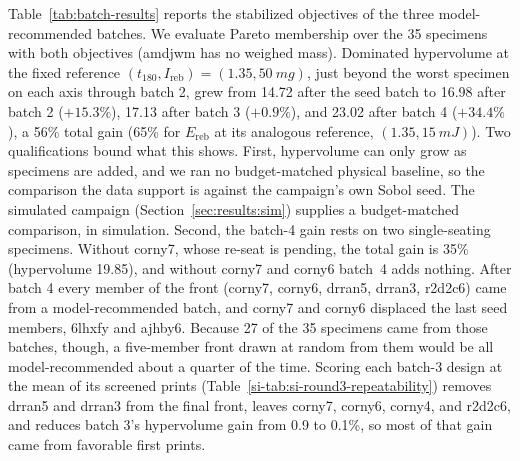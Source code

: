 \documentclass[lineno,nocopyright,upint,varvw,hyphenate]{asmejour}
\newcommand{\siref}[1]{\ref*{si-#1}}
\begin{document}
Table~\ref{tab:batch-results} reports the stabilized objectives of the
three model-recommended batches. We evaluate Pareto membership over the
35 specimens with both objectives (amdjwm has no weighed mass).
Dominated hypervolume at the fixed reference
$(t_{180}, I_{\mathrm{reb}}) = (1.35, \SI{50}{mg})$, just beyond the
worst specimen on each axis through batch 2, grew from 14.72 after the
seed batch to 16.98 after batch 2 ($+15.3\%$), 17.13 after batch 3
($+0.9\%$), and 23.02 after batch 4 ($+34.4\%$), a 56\% total gain (65\%
for $E_{\mathrm{reb}}$ at its analogous reference, $(1.35, \SI{15}{mJ})$).
Two qualifications bound what this shows. First, hypervolume can only
grow as specimens are added, and we ran no budget-matched physical
baseline, so the comparison the data support is against the campaign's
own Sobol seed. The simulated campaign (Section~\ref{sec:results:sim})
supplies a budget-matched comparison, in simulation. Second, the batch-4 gain rests on two
single-seating specimens. Without corny7, whose re-seat is pending, the
total gain is 35\% (hypervolume 19.85), and without corny7 and corny6
batch~4 adds nothing. After batch 4 every member of the front (corny7,
corny6, drran5, drran3, r2d2c6) came from a model-recommended batch, and
corny7 and corny6 displaced the last seed members, 6lhxfy and ajhby6.
Because 27 of the 35 specimens came from those batches, though, a
five-member front drawn at random from them would be all
model-recommended about a quarter of the time. Scoring each batch-3
design at the mean of its screened prints
(Table~\siref{tab:si-round3-repeatability}) removes drran5 and drran3
from the final front, leaves corny7, corny6, corny4, and r2d2c6, and
reduces batch 3's hypervolume gain from 0.9 to 0.1\%, so most of that
gain came from favorable first prints.
\end{document}
